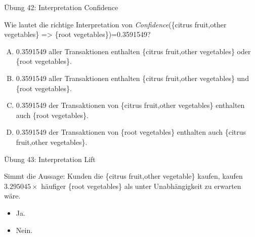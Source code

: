 \documentclass[12pt,ngerman,a4paper,ignorenonframetext,]{beamer}
\providecommand{\tightlist}{%
  \setlength{\itemsep}{0pt}\setlength{\parskip}{0pt}}
\begin{document}
\begin{frame}{Übung 42: Interpretation Confidence}
\protect\hypertarget{ubung-42-interpretation-confidence}{}

Wie lautet die richtige Interpretation von \emph{Confidence}(\{citrus
fruit,other vegetables\} =\textgreater{} \{root vegetables\})=0.3591549?

\begin{enumerate}
[A.]
\tightlist
\item
  0.3591549 aller Transaktionen enthalten \{citrus fruit,other
  vegetables\} oder \{root vegetables\}.
\item
  0.3591549 aller Transaktionen enthalten \{citrus fruit,other
  vegetables\} und \{root vegetables\}.
\item
  0.3591549 der Transaktionen von \{citrus fruit,other vegetables\}
  enthalten auch \{root vegetables\}.
\item
  0.3591549 der Transaktionen von \{root vegetables\} enthalten auch
  \{citrus fruit,other vegetables\}.
\end{enumerate}


\end{frame}

\begin{frame}{Übung 43: Interpretation Lift}
\protect\hypertarget{ubung-43-interpretation-lift}{}

Simmt die Aussage: Kunden die \{citrus fruit,other vegetable\} kaufen,
kaufen \(3.295045\times\) häufiger \{root vegetables\} als unter
Unabhängigkeit zu erwarten wäre.

\begin{itemize}
\tightlist
\item
  Ja.
\item
  Nein.
\end{itemize}


\end{frame}
\end{document}
